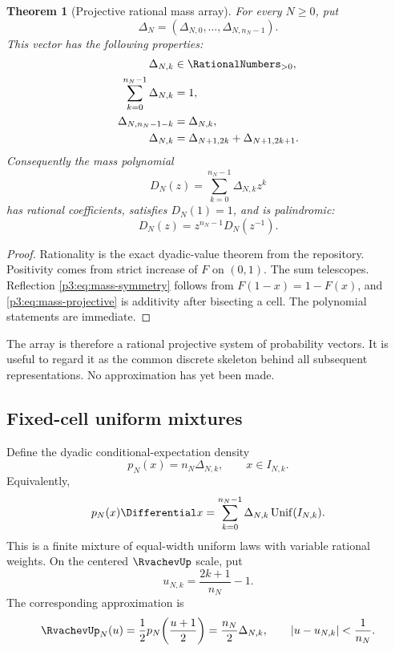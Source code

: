 \documentclass[11pt]{article}
\newtheorem{theorem}{Theorem}[section]
\theoremstyle{definition}
\theoremstyle{remark}
\begin{document}
\begin{theorem}[Projective rational mass array]
\label{p3:thm:projective-masses}
For every $N\ge0$, put
\[
\Delta_N=(\Delta_{N,0},\ldots,\Delta_{N,n_N-1}).
\]
This vector has the following properties:
\begin{align}
 \Delta_{N,k}&\in\RationalNumbers_{>0},\label{p3:eq:mass-rational}\\
 \sum_{k=0}^{n_N-1}\Delta_{N,k}&=1,\label{p3:eq:mass-sum}\\
 \Delta_{N,n_N-1-k}&=\Delta_{N,k},\label{p3:eq:mass-symmetry}\\
 \Delta_{N,k}&=\Delta_{N+1,2k}+\Delta_{N+1,2k+1}.
 \label{p3:eq:mass-projective}
\end{align}
Consequently the mass polynomial
\begin{equation}\label{p3:eq:mass-polynomial}
 D_N(z)=\sum_{k=0}^{n_N-1}\Delta_{N,k}z^k
\end{equation}
has rational coefficients, satisfies $D_N(1)=1$, and is palindromic:
\begin{equation}\label{p3:eq:D-palindromic}
 D_N(z)=z^{n_N-1}D_N(z^{-1}).
\end{equation}
\end{theorem}

\begin{proof}
Rationality is the exact dyadic-value theorem from the repository.  Positivity
comes from strict increase of $F$ on $(0,1)$.  The sum telescopes.  Reflection
\eqref{p3:eq:mass-symmetry} follows from $F(1-x)=1-F(x)$, and
\eqref{p3:eq:mass-projective} is additivity after bisecting a cell.  The polynomial
statements are immediate.
\end{proof}

The array is therefore a rational projective system of probability vectors.
It is useful to regard it as the common discrete skeleton behind all subsequent
representations.  No approximation has yet been made.

\subsection{Fixed-cell uniform mixtures}

Define the dyadic conditional-expectation density
\begin{equation}\label{p3:eq:pN-def}
 p_N(x)=n_N\Delta_{N,k},\qquad x\in I_{N,k}.
\end{equation}
Equivalently,
\begin{equation}\label{p3:eq:pN-mixture}
 p_N(x)\Differential x
 =\sum_{k=0}^{n_N-1}\Delta_{N,k}
   \operatorname{Unif}(I_{N,k}).
\end{equation}
This is a finite mixture of equal-width uniform laws with variable rational
weights.  On the centered $\RvachevUp$ scale, put
\begin{equation}\label{p3:eq:up-cell-centers}
 u_{N,k}=\frac{2k+1}{n_N}-1.
\end{equation}
The corresponding approximation is
\begin{equation}\label{p3:eq:upN-def}
 \RvachevUp_N(u)=\frac12p_N\!\left(\frac{u+1}{2}\right)
 =\frac{n_N}{2}\Delta_{N,k},
 \qquad |u-u_{N,k}|<\frac1{n_N}.
\end{equation}
\end{document}
